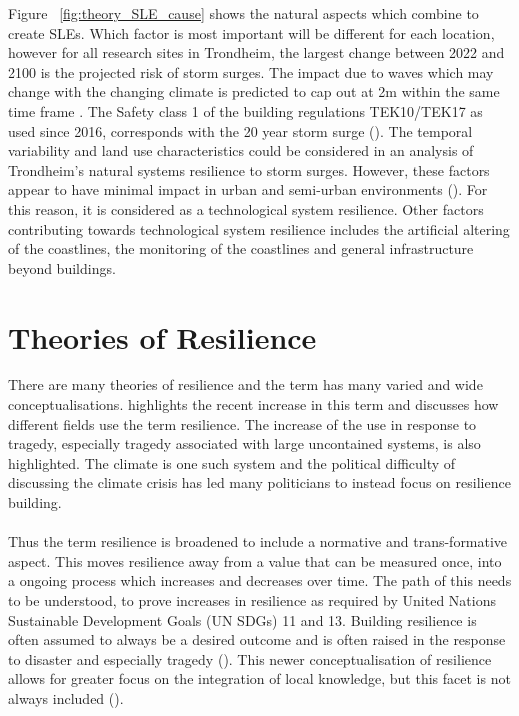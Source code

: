 Figure ~\ref{fig:theory_SLE_cause} shows the natural aspects which combine to create SLEs. Which factor is most important will be different for each location, however for all research sites in Trondheim, the largest change between 2022 and 2100 is the projected risk of storm surges. The impact due to waves which may change with the changing climate is predicted to cap out at 2m within the same time frame \cite{hanssen_saksframlegg_2013}. The Safety class 1 of the building regulations TEK10/TEK17 as used since 2016, corresponds with the 20 year storm surge (\cite{tides_high_2022}). The temporal variability and land use characteristics could be considered in an analysis of Trondheim's natural systems resilience to storm surges. However, these factors appear to have minimal impact in urban and semi-urban environments (\cite{hoffken_effects_2020}). For this reason, it is considered as a technological system resilience. Other factors contributing towards technological system resilience includes the artificial altering of the coastlines, the monitoring of the coastlines and general infrastructure beyond buildings.

\section{Theories of Resilience }

There are many theories of resilience and the term has many varied and wide conceptualisations. \cite{moser_turbulent_2019} highlights the recent increase in this term and discusses how different fields use the term resilience.  The increase of the use in response to tragedy, especially tragedy associated with large uncontained systems, is also highlighted. The climate is one such system and the political difficulty of discussing the climate crisis has led many politicians to instead focus on resilience building. 
\paragraph{}

Thus the term resilience is broadened to include a normative and trans-formative aspect.  This moves resilience away from a value that can be measured once, into a ongoing process which increases and decreases over time. The path of this needs to be understood, to prove increases in resilience as required by United Nations Sustainable Development Goals (UN SDGs) 11 and 13. Building resilience is often assumed to always be a desired outcome and is often raised in the response to disaster and especially tragedy (\cite{moser_turbulent_2019}). This newer conceptualisation of resilience allows for greater focus on the integration of local knowledge, but this facet is not always included (\cite{moser_turbulent_2019}).
